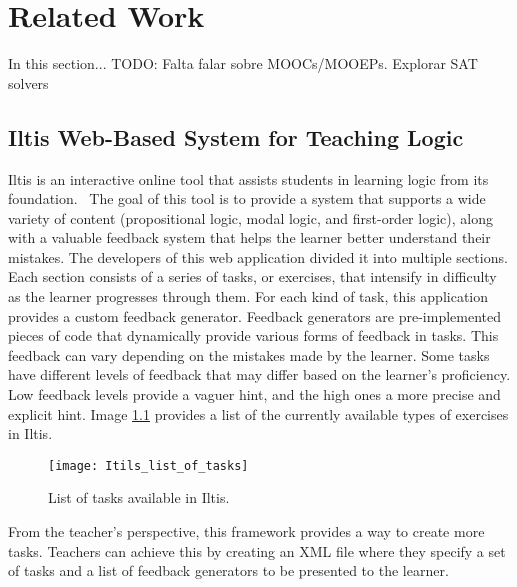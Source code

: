 
%

\chapter{Related Work}

In this section...
TODO: Falta falar sobre MOOCs/MOOEPs. Explorar SAT solvers

\section{Iltis Web-Based System for Teaching Logic}
\label{chap:iltis}

Iltis is an interactive online tool that assists students in learning logic from its foundation.~\cite{geck_iltis, geck_2018_introduction} The goal of this tool is to provide a system that supports a wide variety of content (propositional logic, modal logic, and first-order logic), along with a valuable feedback system that helps the learner better understand their mistakes. The developers of this web application divided it into multiple sections. Each section consists of a series of tasks, or exercises, that intensify in difficulty as the learner progresses through them. For each kind of task, this application provides a custom feedback generator. Feedback generators are pre-implemented pieces of code that dynamically provide various forms of feedback in tasks. This feedback can vary depending on the mistakes made by the learner. Some tasks have different levels of feedback that may differ based on the learner’s proficiency. Low feedback levels provide a vaguer hint, and the high ones a more precise and explicit hint. Image \ref{img:iltis_tasks} provides a list of the currently available types of exercises in Iltis.

\begin{figure}[htbp]
    \centering
    \texttt{[image: Itils\_list\_of\_tasks]}
    \caption{List of tasks available in Iltis.}
    \label{img:iltis_tasks}
\end{figure}

From the teacher’s perspective, this framework provides a way to create more tasks. Teachers can achieve this by creating an XML file where they specify a set of tasks and a list of feedback generators to be presented to the learner.

